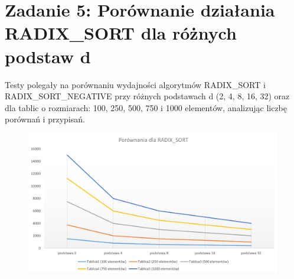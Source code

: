 \documentclass{article}
\theoremstyle{definition}
\begin{document}
	\section{Zadanie 5:  Porównanie działania RADIX\_SORT dla różnych podstaw d}
		Testy polegały na porównaniu wydajności algorytmów RADIX\_SORT i RADIX\_SORT\_NEGATIVE przy różnych podstawach	d (2, 4, 8, 16, 32) oraz dla tablic o rozmiarach: 100, 250, 500, 750 i 1000 elementów, analizując liczbę porównań i przypisań.
		\begin{table}[H]
			\centering
			\caption{Zestawienie ilości porównań dla różnych podstaw w RADIX\_SORT.}
		\end{table}
		\begin{figure}[H]	
			\centering
			\includegraphics[width=1.0\textwidth]{POR2.jpg} 
		\end{figure}	
\end{document}
